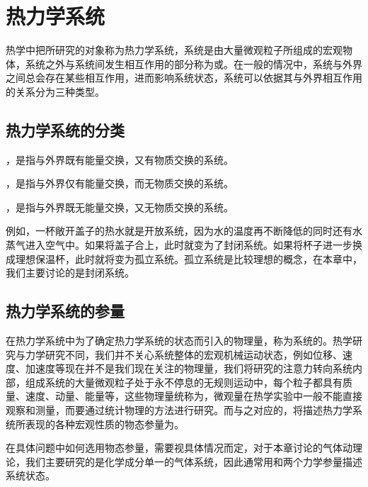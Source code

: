 \section{热力学系统}

热学中把所研究的对象称为热力学系统，系统是由大量微观粒子所组成的宏观物体，系统之外与系统间发生相互作用的部分称为或。在一般的情况中，系统与外界之间总会存在某些相互作用，进而影响系统状态，系统可以依据其与外界相互作用的关系分为三种类型。

\subsection{热力学系统的分类}
\begin{BoxDefinition}[开放系统]
    ，是指与外界既有能量交换，又有物质交换的系统。    
\end{BoxDefinition}

\begin{BoxDefinition}[封闭系统]
    ，是指与外界仅有能量交换，而无物质交换的系统。    
\end{BoxDefinition}

\begin{BoxDefinition}[孤立系统]
    ，是指与外界既无能量交换，又无物质交换的系统。    
\end{BoxDefinition}

例如，一杯敞开盖子的热水就是开放系统，因为水的温度再不断降低的同时还有水蒸气进入空气中。如果将盖子合上，此时就变为了封闭系统。如果将杯子进一步换成理想保温杯，此时就将变为孤立系统。孤立系统是比较理想的概念，在本章中，我们主要讨论的是封闭系统。\vspace{-0.2cm}

\subsection{热力学系统的参量}
在热力学系统中为了确定热力学系统的状态而引入的物理量，称为系统的。热学研究与力学研究不同，我们并不关心系统整体的宏观机械运动状态，例如位移、速度、加速度等现在并不是我们现在关注的物理量，我们将研究的注意力转向系统内部，组成系统的大量微观粒子处于永不停息的无规则运动中，每个粒子都具有质量、速度、动量、能量等，这些物理量统称为，微观量在热学实验中一般不能直接观察和测量，而要通过统计物理的方法进行研究。而与之对应的，将描述热力学系统所表现的各种宏观性质的物态参量为。

在具体问题中如何选用物态参量，需要视具体情况而定，对于本章讨论的气体动理论，我们主要研究的是化学成分单一的气体系统，因此通常用和两个力学参量描述系统状态。

